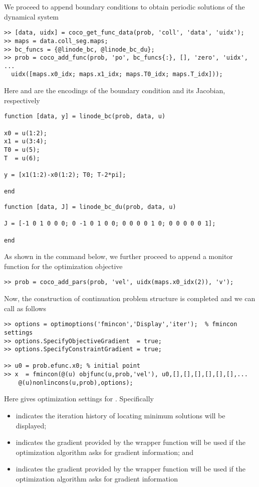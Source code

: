 We proceed to append boundary conditions to obtain periodic solutions of the dynamical system
\begin{lstlisting}[language=coco-highlight]
>> [data, uidx] = coco_get_func_data(prob, 'coll', 'data', 'uidx');
>> maps = data.coll_seg.maps;
>> bc_funcs = {@linode_bc, @linode_bc_du};
>> prob = coco_add_func(prob, 'po', bc_funcs{:}, [], 'zero', 'uidx', ...
  uidx([maps.x0_idx; maps.x1_idx; maps.T0_idx; maps.T_idx]));
\end{lstlisting}
Here  and  are the encodings of the boundary condition and its Jacobian, respectively
\begin{lstlisting}[language=coco-highlight]
function [data, y] = linode_bc(prob, data, u) 

x0 = u(1:2);
x1 = u(3:4);
T0 = u(5);
T  = u(6);

y = [x1(1:2)-x0(1:2); T0; T-2*pi];

end
\end{lstlisting}
\begin{lstlisting}[language=coco-highlight]
function [data, J] = linode_bc_du(prob, data, u)

J = [-1 0 1 0 0 0; 0 -1 0 1 0 0; 0 0 0 0 1 0; 0 0 0 0 0 1];

end
\end{lstlisting}
As shown in the command below, we further proceed to append a monitor function for the optimization objective
\begin{lstlisting}[language=coco-highlight]
>> prob = coco_add_pars(prob, 'vel', uidx(maps.x0_idx(2)), 'v');
\end{lstlisting}

Now, the construction of continuation problem structure  is completed and we can call  as follows
\begin{lstlisting}[language=coco-highlight]
>> options = optimoptions('fmincon','Display','iter');  % fmincon settings
>> options.SpecifyObjectiveGradient  = true;
>> options.SpecifyConstraintGradient = true;

>> u0 = prob.efunc.x0; % initial point
>> x  = fmincon(@(u) objfunc(u,prob,'vel'), u0,[],[],[],[],[],[],...
	@(u)nonlincons(u,prob),options);
\end{lstlisting}
Here  gives optimization settings for . Specifically
\begin{itemize}
\item {} indicates the iteration history of locating minimum solutions will be displayed;
\item {} indicates the gradient provided by the wrapper function  will be used if the optimization algorithm asks for gradient information; and
\item {} indicates the gradient provided by the wrapper function  will be used if the optimization algorithm asks for gradient information
\end{itemize}

